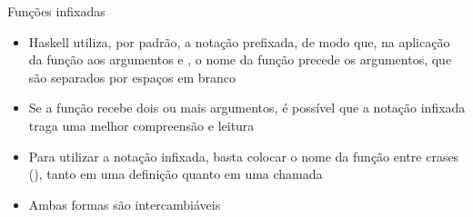\begin{frame}[fragile]{Funções infixadas}

    \begin{itemize}
        \item Haskell utiliza, por padrão, a notação prefixada, de modo que, na aplicação da função
             aos argumentos  e , o nome da
            função precede os argumentos, que são separados por espaços em branco


        \item Se a função recebe dois ou mais argumentos, é possível que a notação infixada traga
            uma melhor compreensão e leitura

        \item Para utilizar a notação infixada, basta colocar o nome da função entre crases
            (), tanto em uma definição quanto em uma chamada

        \item Ambas formas são intercambiáveis

    \end{itemize}

\end{frame}

